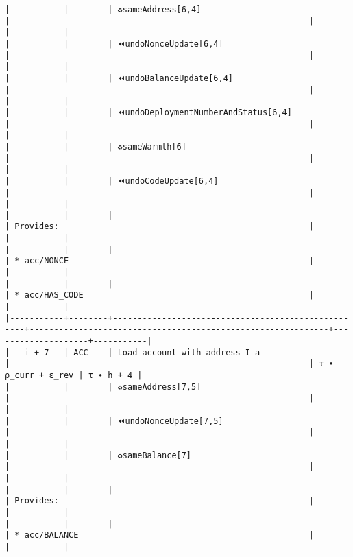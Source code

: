 \documentclass[varwidth=\maxdimen,margin=0.5cm,multi={verbatim}]{standalone}
\begin{document}
\begin{verbatim}
|           |        | ♻️sameAddress[6,4]                                 |                                                             |                    |           |
|           |        | ⏪undoNonceUpdate[6,4]                             |                                                             |                    |           |
|           |        | ⏪undoBalanceUpdate[6,4]                           |                                                             |                    |           |
|           |        | ⏪undoDeploymentNumberAndStatus[6,4]               |                                                             |                    |           |
|           |        | ♻️sameWarmth[6]                                    |                                                             |                    |           |
|           |        | ⏪undoCodeUpdate[6,4]                              |                                                             |                    |           |
|           |        |                                                    | Provides:                                                   |                    |           |
|           |        |                                                    | * acc/NONCE                                                 |                    |           |
|           |        |                                                    | * acc/HAS_CODE                                              |                    |           |
|-----------+--------+----------------------------------------------------+-------------------------------------------------------------+--------------------+-----------|
|   i + 7   | ACC    | Load account with address I_a                      |                                                             | τ ∙ ρ_curr + ε_rev | τ ∙ h + 4 |
|           |        | ♻️sameAddress[7,5]                                 |                                                             |                    |           |
|           |        | ⏪undoNonceUpdate[7,5]                             |                                                             |                    |           |
|           |        | ♻️sameBalance[7]                                   |                                                             |                    |           |
|           |        |                                                    | Provides:                                                   |                    |           |
|           |        |                                                    | * acc/BALANCE                                               |                    |           |

\end{verbatim}
\end{document}
